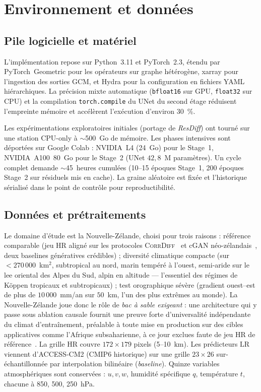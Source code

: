 \documentclass[14pt,a4paper,openany]{extreport}
\newcommand{\CorrDiff}{\textsc{CorrDiff}}
\newcommand{\HR}{\ensuremath{\text{HR}}}
\newcommand{\LR}{\ensuremath{\text{LR}}}
\begin{document}
\section{Environnement et données}
\label{sec:exp-env}

\subsection{Pile logicielle et matériel}
\label{ssec:exp-env-soft}

L'implémentation repose sur Python~3.11 et PyTorch~2.3, étendu par PyTorch~Geometric pour les opérateurs sur graphe hétérogène, xarray pour l'ingestion des sorties GCM, et Hydra pour la configuration en fichiers YAML hiérarchiques. La précision mixte automatique (\texttt{bfloat16} sur GPU, \texttt{float32} sur CPU) et la compilation \texttt{torch.compile} du UNet du second étage réduisent l'empreinte mémoire et accélèrent l'exécution d'environ 30~\%.

Les expérimentations exploratoires initiales (portage de \emph{ResDiff}) ont tourné sur une station CPU-only à $\sim$500~Go de mémoire. Les phases intensives sont déportées sur Google Colab : NVIDIA~L4 (24~Go) pour le Stage~1, NVIDIA~A100~80~Go pour le Stage~2 (UNet $42{,}8$~M paramètres). Un cycle complet demande $\sim$45~heures cumulées (10--15 époques Stage~1, 200 époques Stage~2 sur résiduels mis en cache). La graine aléatoire est fixée et l'historique sérialisé dans le point de contrôle pour reproductibilité.

\subsection{Données et prétraitements}
\label{ssec:exp-env-data}

Le domaine d'étude est la Nouvelle-Zélande, choisi pour trois raisons : référence comparable (jeu HR aligné sur les protocoles \CorrDiff{}~\cite{mardani_corrdiff_2023} et cGAN néo-zélandais~\cite{rampal_cgan_2024}, deux baselines génératives crédibles) ; diversité climatique compacte (sur $<270\,000$~km$^2$, subtropical au nord, marin tempéré à l'ouest, semi-aride sur le lee oriental des Alpes du Sud, alpin en altitude --- l'essentiel des régimes de Köppen tropicaux et subtropicaux) ; test orographique sévère (gradient ouest--est de plus de $10\,000$~mm/an sur $50$~km, l'un des plus extrêmes au monde). La Nouvelle-Zélande joue donc le rôle de \emph{bac à sable exigeant} : une architecture qui y passe sous ablation causale fournit une preuve forte d'universalité indépendante du climat d'entraînement, préalable à toute mise en production sur des cibles applicatives comme l'Afrique subsaharienne, à ce jour exclues faute de jeu HR de référence~\cite{bachmann_hpc_africa_2025}. La grille \HR{} couvre $172 \times 179$ pixels (5--10~km). Les prédicteurs \LR{} viennent d'ACCESS-CM2 (CMIP6 historique) sur une grille $23 \times 26$ sur-échantillonnée par interpolation bilinéaire (\emph{baseline}). Quinze variables atmosphériques sont conservées : $u, v, w$, humidité spécifique $q$, température $t$, chacune à 850, 500, 250~hPa.
\end{document}
